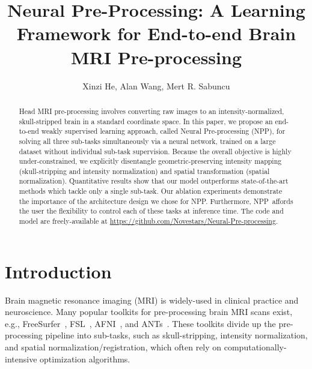 \documentclass[runningheads]{llncs}
\newcommand{\modelname}{NPP}
\begin{document}
\title{Neural Pre-Processing: A Learning Framework
for End-to-end Brain MRI Pre-processing}

\author{Xinzi He, Alan Wang, Mert R. Sabuncu}
\maketitle              \begin{abstract}
Head MRI pre-processing involves converting raw images to an intensity-normalized, skull-stripped brain in a standard coordinate space. 
In this paper, we propose an end-to-end weakly supervised learning approach, called Neural Pre-processing (\modelname), for solving all three sub-tasks simultaneously via a neural network, trained on a large dataset without individual sub-task supervision. 
Because the overall objective is highly under-constrained, we explicitly disentangle geometric-preserving intensity mapping (skull-stripping and intensity normalization) and spatial transformation (spatial normalization). 
Quantitative results show that our model outperforms state-of-the-art methods which tackle only a single sub-task. 
Our ablation experiments demonstrate the importance of the architecture design we chose for \modelname.
Furthermore, \modelname~affords the user the flexibility to control each of these tasks at inference time. 
The code and model are freely-available at \url{https://github.com/Novestars/Neural-Pre-processing}.

\end{abstract}
\section{Introduction}
Brain magnetic resonance imaging (MRI) is widely-used in clinical practice and neuroscience. Many popular toolkits for pre-processing brain MRI scans exist, e.g., FreeSurfer~\cite{fischl2012freesurfer}, FSL~\cite{Smith2004}, AFNI~\cite{cox1996afni}, and ANTs~\cite{Avants2008}. 
These toolkits divide up the pre-processing pipeline into sub-tasks, such as skull-stripping, intensity normalization, and spatial normalization/registration, which often rely on computationally-intensive optimization algorithms. 
\end{document}
